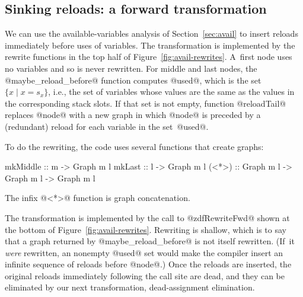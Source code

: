 \documentclass[blockstyle,preprint,nocopyrightspace]{sigplanconf}
\newcommand\slotof[1]{\ensuremath{s_{#1}}}
\newcommand{\authornote}[1]{{\em #1}}
\def\authornote#1{\unskip\relax}
\newcommand{\simon}[1]{\authornote{SLPJ: #1}}
\newcommand\secref[1]{Section~\ref{sec:#1}}
\newcommand\seclabel[1]{\label{sec:#1}}
\newcommand\figref[1]{Figure~\ref{fig:#1}}
\begin{document}
\subsection{Sinking reloads: a forward transformation}
\simon{Backward reference needed to ``Pass 2 of the algorithm described
in the preamble to Section 4''}

\simon{I believe that in fact we never make the call to @zdfSolveFwd@ given 
in Figure 3?  Instead we pass the transfer functions @avails\_reloads\_transfer@
to @zdfRewriteFwd@?  Whose call is not given in Figure 6. Perhpas we should give
the latter call, and point out that the call in Figure 3 is illustrative and
is not in fact used?}

\simon{Incidentally, I wonder if we should
use record notation when constructing @ForwardRewrites@?}

\seclabel{sink-reloads}

We can use the available-variables analysis of \secref{avail} to
insert reloads
immediately before uses of variables.
The transformation is implemented by the rewrite functions in the top
half of \figref{avail-rewrites}.
A~first node uses no variables and so is never rewritten.
For middle and last nodes, the @maybe_reload_before@ function
computes @used@, which is the set $\{ x \mid x = \slotof x\}$, i.e., 
the set of variables whose values are the same as the values in the
corresponding stack slots.
If that set is not empty, function
@reloadTail@ replaces @node@ with a new graph in which @node@ is
preceded by a (redundant) reload for each variable in the set~@used@.

To do the rewriting, the code uses several functions that create
graphs:
\begin{code}
mkMiddle :: m -> Graph m l
mkLast   :: l -> Graph m l
(<*>)    :: Graph m l -> Graph m l -> Graph m l
\end{code}
The infix @<*>@ function is graph concatenation.

The transformation is implemented by the call to @zdfRewriteFwd@
shown at the bottom of \figref{avail-rewrites}.
Rewriting is shallow, which is to say that a graph returned by
@maybe_reload_before@ is not itself rewritten.
(If~it \emph{were} rewritten, an nonempty @used@ set would make the
compiler insert an infinite sequence of reloads before @node@.)
Once the reloads are inserted, the original reloads immediately
following the call site are dead, and they can be eliminated by our
next transformation, dead-assignment elimination.
\end{document}

